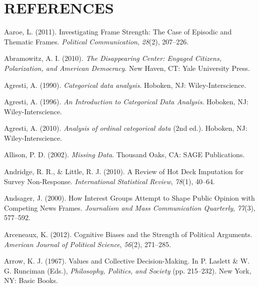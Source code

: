 \documentclass[12pt,econ]{sources/authesis}
\begin{document}
\hypertarget{references}{%
\chapter*{REFERENCES}\label{references}}

\noindent

\ssp

\hypertarget{refs}{}
\leavevmode\hypertarget{ref-aaroe_investigating_2011}{}%
Aaroe, L. (2011). Investigating Frame Strength: The Case of Episodic and Thematic Frames. \emph{Political Communication}, \emph{28}(2), 207--226.

\leavevmode\hypertarget{ref-abramowitz_disappearing_2010}{}%
Abramowitz, A. I. (2010). \emph{The Disappearing Center: Engaged Citizens, Polarization, and American Democracy}. New Haven, CT: Yale University Press.

\leavevmode\hypertarget{ref-agresti_1990_categorical}{}%
Agresti, A. (1990). \emph{Categorical data analysis}. Hoboken, NJ: Wiley-Interscience.

\leavevmode\hypertarget{ref-agresti_1996_introduction}{}%
Agresti, A. (1996). \emph{An Introduction to Categorical Data Analysis}. Hoboken, NJ: Wiley-Interscience.

\leavevmode\hypertarget{ref-agresti_2010_analysis}{}%
Agresti, A. (2010). \emph{Analysis of ordinal categorical data} (2nd ed.). Hoboken, NJ: Wiley-Interscience.

\leavevmode\hypertarget{ref-allison_2002_missing}{}%
Allison, P. D. (2002). \emph{Missing Data}. Thousand Oaks, CA: SAGE Publications.

\leavevmode\hypertarget{ref-andridge_2010_review}{}%
Andridge, R. R., \& Little, R. J. (2010). A Review of Hot Deck Imputation for Survey Non-Response. \emph{International Statistical Review}, \emph{78}(1), 40--64.

\leavevmode\hypertarget{ref-andsager_how_2000}{}%
Andsager, J. (2000). How Interest Groups Attempt to Shape Public Opinion with Competing News Frames. \emph{Journalism and Mass Communication Quarterly}, \emph{77}(3), 577--592.

\leavevmode\hypertarget{ref-arceneaux_cognitive_2012}{}%
Arceneaux, K. (2012). Cognitive Biases and the Strength of Political Arguments. \emph{American Journal of Political Science}, \emph{56}(2), 271--285.

\leavevmode\hypertarget{ref-arrow_1967_values}{}%
Arrow, K. J. (1967). Values and Collective Decision-Making. In P. Laslett \& W. G. Runciman (Eds.), \emph{Philosophy, Politics, and Society} (pp. 215--232). New York, NY: Basic Books.
\end{document}
